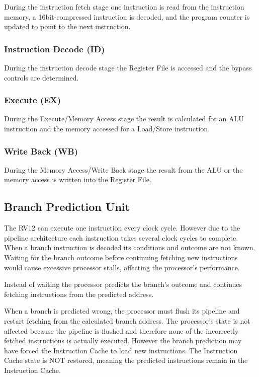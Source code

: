 During the instruction fetch stage one instruction is read from the
instruction memory, a 16bit-compressed instruction is decoded, and the
program counter is updated to point to the next instruction.

\subsubsection{Instruction Decode (ID)}\label{instruction-decode-id}

During the instruction decode stage the Register File is accessed and
the bypass controls are determined.

\subsubsection{Execute (EX)}\label{execute-ex}

During the Execute/Memory Access stage the result is calculated for an
ALU instruction and the memory accessed for a Load/Store instruction.

\subsubsection{Write Back (WB)}\label{write-back-wb}

During the Memory Access/Write Back stage the result from the ALU or the
memory access is written into the Register
File.

\subsection{Branch Prediction Unit}\label{branch-prediction-unit}

The RV12 can execute one instruction every clock cycle. However due to
the pipeline architecture each instruction takes several clock cycles to
complete. When a branch instruction is decoded its conditions and
outcome are not known. Waiting for the branch outcome before continuing
fetching new instructions would cause excessive processor stalls,
affecting the processor's performance.

Instead of waiting the processor predicts the branch's outcome and
continues fetching instructions from the predicted address.

When a branch is predicted wrong, the processor must flush its pipeline
and restart fetching from the calculated branch address. The processor's
state is not affected because the pipeline is flushed and therefore none
of the incorrectly fetched instructions is actually executed. However
the branch prediction may have forced the Instruction Cache to load new
instructions. The Instruction Cache state is NOT restored, meaning the
predicted instructions remain in the Instruction Cache.

